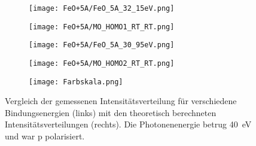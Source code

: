 \begin{figure}
                \centering
                \begin{subfigure}[t]{0.48\textwidth}
                    \centering
                    \texttt{[image: FeO+5A/FeO\_5A\_32\_15eV.png]}
                    \label{fig:MOT_FeO+5A_exp_3}
                \end{subfigure}
                \begin{subfigure}[t]{0.48\textwidth}
                    \centering
                    \texttt{[image: FeO+5A/MO\_HOMO1\_RT\_RT.png]}
                    \label{fig:MOT_FeO+5A_theo_3}
                \end{subfigure}
                \centering
                \begin{subfigure}[t]{0.48\textwidth}
                    \centering
                    \texttt{[image: FeO+5A/FeO\_5A\_30\_95eV.png]}
                    \label{fig:MOT_FeO+5A_exp_4}
                \end{subfigure}
                \begin{subfigure}[t]{0.48\textwidth}
                    \centering
                    \texttt{[image: FeO+5A/MO\_HOMO2\_RT\_RT.png]}
                    \label{fig:MOT_FeO+5A_theo_4}
                \end{subfigure}
                \begin{subfigure}[t]{\textwidth}
                    \centering
                    \texttt{[image: Farbskala.png]}
                \end{subfigure}
                \caption{Vergleich der gemessenen Intensitätsverteilung für verschiedene Bindungsenergien (links) mit den theoretisch berechneten Intensitätsverteilungen (rechts).
                Die Photonenenergie betrug \SI{40}{\electronvolt} und war p polarisiert.}
                \label{fig:MOT_FeO_5A}
            \end{figure}

